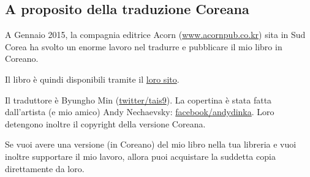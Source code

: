 



\subsection*{A proposito della traduzione Coreana}

A Gennaio 2015, la compagnia editrice Acorn (\href{http://www.acornpub.co.kr}{www.acornpub.co.kr}) sita in Sud Corea ha svolto un enorme lavoro nel tradurre e pubblicare il mio libro in Coreano.

Il libro è quindi disponibili tramite il \href{http://go.yurichev.com/17343}{loro sito}.

\iffalse
\begin{figure}[H]
\centering
\texttt{[image: acorn\_cover.jpg]}
\end{figure}
\fi

Il traduttore è Byungho Min (\href{http://go.yurichev.com/17344}{twitter/tais9}).
La copertina è stata fatta dall'artista (e mio amico) Andy Nechaevsky:
\href{http://go.yurichev.com/17023}{facebook/andydinka}.
Loro detengono inoltre il copyright della versione Coreana.

Se vuoi avere una versione  (in Coreano) del mio libro nella tua libreria e 
vuoi inoltre supportare il mio lavoro, allora puoi acquistare la suddetta copia direttamente da loro.


